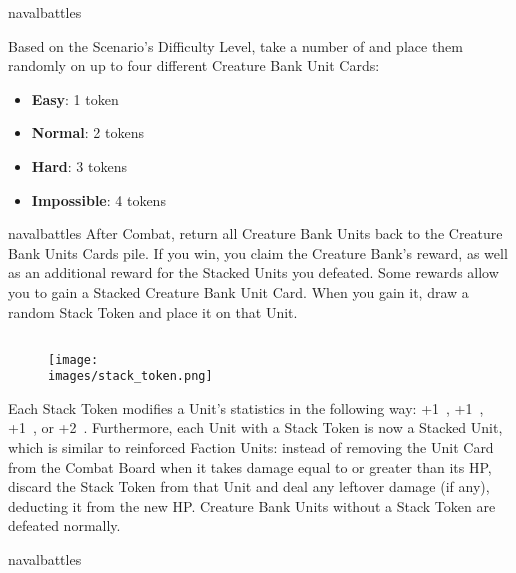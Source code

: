 \begin{expansion}[before=\vspace*{-11mm}]{navalbattles}
\begin{multicols*}{2}
  Based on the Scenario's Difficulty Level, take a number of  and place them randomly on up to four different Creature Bank Unit Cards:
  \begin{itemize}
    \item \textbf{Easy}: 1 token
    \item \textbf{Normal}: 2 tokens
    \item \textbf{Hard}: 3 tokens
    \item \textbf{Impossible}: 4 tokens
  \end{itemize}

  \end{multicols*}
\end{expansion}

\begin{multicols*}{2}
\begin{expansion}[before=\vspace*{-11mm}]{navalbattles}
  After Combat, return all Creature Bank Units back to the Creature Bank Units Cards pile.
  If you win, you claim the Creature Bank's reward, as well as an additional reward for the Stacked Units you defeated.
  Some rewards allow you to gain a Stacked Creature Bank Unit Card.
  When you gain it, draw a random Stack Token and place it on that Unit.

  \subsection*{}
  \setlength\intextsep{0pt}
  \setlength\columnsep{1em}
  \begin{wrapfigure}{r}{0.2\linewidth}
    \texttt{[image: \\images/stack\_token.png]}
  \end{wrapfigure}
  Each Stack Token modifies a Unit's statistics in the following way: +1~, +1~, +1~, or +2~.
  Furthermore, each Unit with a Stack Token is now a Stacked Unit, which is similar to reinforced Faction Units: instead of removing the Unit Card from the Combat Board when it takes damage equal to or greater than its HP, discard the Stack Token from that Unit and deal any leftover damage (if any), deducting it from the new HP.
  Creature Bank Units without a Stack Token are defeated normally.
\end{expansion}

\vspace*{1em}
\begin{expansion}{navalbattles}

\end{expansion}
\end{multicols*}
